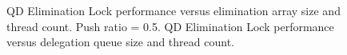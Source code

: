 \begin{figure}[]
\centering
{}
\caption[]{ QD Elimination Lock performance versus elimination array size and thread count. Push ratio = 0.5.  QD Elimination Lock performance versus delegation queue size and thread count.}
\label{fig:qdsize_and_thrd}
\end{figure}
